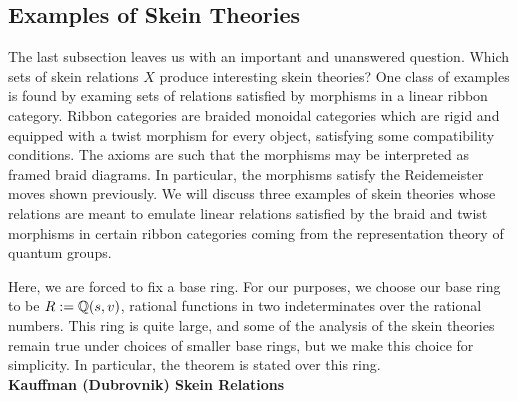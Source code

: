 
\subsection{Examples of Skein Theories}

The last subsection leaves us with an important and unanswered question. Which sets of skein relations $X$ produce interesting skein theories? One class of examples is found by examing sets of relations satisfied by morphisms in a linear ribbon category. Ribbon categories are braided monoidal categories which are rigid and equipped with a twist morphism for every object, satisfying some compatibility conditions. The axioms are such that the morphisms may be interpreted as framed braid diagrams. In particular, the morphisms satisfy the Reidemeister moves shown previously. We will discuss three examples of skein theories whose relations are meant to emulate linear relations satisfied by the braid and twist morphisms in certain ribbon categories coming from the representation theory of quantum groups. 

Here, we are forced to fix a base ring. For our purposes, we choose our base ring to be $R := \mathbb{Q}(s, v)$, rational functions in two indeterminates over the rational numbers. This ring is quite large, and some of the analysis of the skein theories remain true under choices of smaller base rings, but we make this choice for simplicity. In particular, the theorem  is stated over this ring. \\
\textbf{Kauffman (Dubrovnik) Skein Relations}

